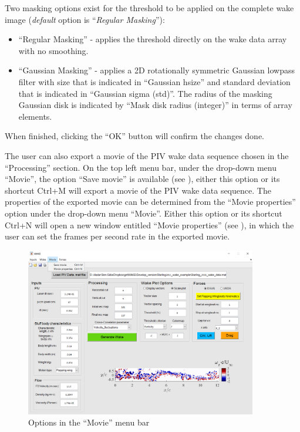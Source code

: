 \documentclass[12pt,a4paper]{article}
\begin{document}
Two masking options exist for the threshold to be applied on the complete wake image (\textit{default} option is ``\textit{Regular Masking}''):
\begin{itemize}
	\item ``Regular Masking'' - applies the threshold directly on the wake data array with no smoothing.
	\item ``Gaussian Masking'' - applies a 2D rotationally symmetric Gaussian lowpass filter with size that is indicated in ``Gaussian hsize'' and standard deviation that is indicated in ``Gaussian sigma (std)''. The radius of the masking Gaussian disk is indicated by ``Mask disk radius (integer)'' in terms of array elements.
\end{itemize}
When finished, clicking the ``OK'' button will confirm the changes done.

The user can also export a movie of the PIV wake data sequence chosen in the ``Processing'' section. 
On the top left menu bar, under the drop-down menu ``Movie'', the option ``Save movie'' is available (see ), either this option or its shortcut Ctrl+M will export a movie of the PIV wake data sequence.
The properties of the exported movie can be determined from the ``Movie properties'' option under the drop-down menu ``Movie''. 
Either this option or its shortcut Ctrl+N will open a new window entitled ``Movie properties'' (see ), in which the user can set the frames per second rate in the exported movie.

\begin{figure}[ht!]
	\centering
	\includegraphics[width=0.9\textwidth]{Movie-menubar}
	\caption{Options in the ``Movie'' menu bar}
	\label{fig:GUI-Movie-menubar}
\end{figure}
\end{document}
